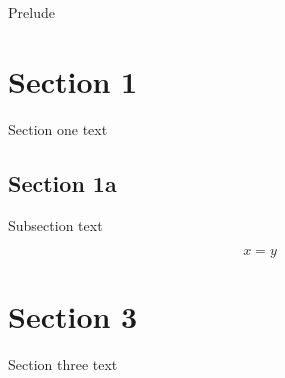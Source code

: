 \documentclass{article}
\begin{document}
\label{frontmatter:dedication}

\maketitle

Prelude
\label{main:preface}

\section{Section 1}
\label{sec:1}
Section one text

\subsection{Section 1a}
\label{sec:1a}
Subsection text

\begin{equation}
\label{eq:1a}
x = y
\end{equation}

\section{Section 3}
\label{sec:3}
Section three text
\end{document}
